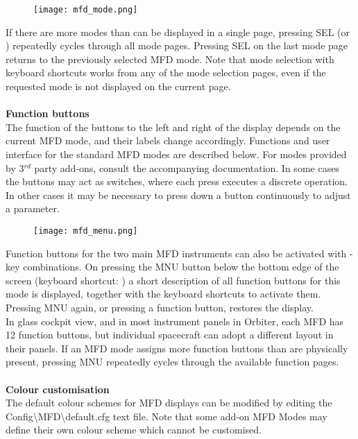 \documentclass[Orbiter User Manual.tex]{subfiles}
\begin{document}
\begin{figure}[H]
  \centering
  \texttt{[image: mfd\_mode.png]}
\end{figure}

\noindent
If there are more modes than can be displayed in a single page, pressing SEL (or \Shift{}) repeatedly cycles through all mode pages. Pressing SEL on the last mode page returns to the previously selected MFD mode. Note that mode selection with keyboard shortcuts works from any of the mode selection pages, even if the requested mode is not displayed on the current page.\\
\\
\textbf{Function buttons}\\
The function of the buttons to the left and right of the display depends on the current MFD mode, and their labels change accordingly. Functions and user interface for the standard MFD modes are described below. For modes provided by 3$^{rd}$ party add-ons, consult the accompanying documentation. In some cases the buttons may act as switches, where each press executes a discrete operation. In other cases it may be necessary to press down a button continuously to adjust a parameter.

\begin{figure}[H]
  \centering
  \texttt{[image: mfd\_menu.png]}
\end{figure}

\noindent
Function buttons for the two main MFD instruments can also be activated with \Shift-key combinations. On pressing the MNU button below the bottom edge of the screen (keyboard shortcut: \Shift{}) a short description of all function buttons for this mode is displayed, together with the keyboard shortcuts to activate them. Pressing MNU again, or pressing a function button, restores the display.\\
In glass cockpit view, and in most instrument panels in Orbiter, each MFD has 12 function buttons, but individual spacecraft can adopt a different layout in their panels. If an MFD mode assigns more function buttons than are physically present, pressing MNU repeatedly cycles through the available function pages.\\
\\
\textbf{Colour customisation}\\
The default colour schemes for MFD displays can be modified by editing the Config\textbackslash MFD\textbackslash default.cfg text file. Note that some add-on MFD Modes may define their own colour scheme which cannot be customised.
\end{document}
